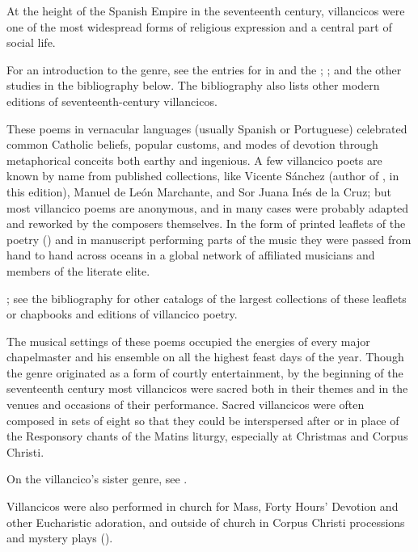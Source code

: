 
At the height of the Spanish Empire in the seventeenth century,
villancicos were one of the most widespread forms of religious expression and a 
central part of social life.%
  \begin{Footnote}
      For an introduction to the genre, see the entries for  in 
       and the ; \autocites{Laird:VC}{Knighton-Torrente:VCs};
      and the other studies in the bibliography below.
      The bibliography also lists other modern editions of seventeenth-century
      villancicos.  
  \end{Footnote}
These poems in vernacular languages (usually Spanish or Portuguese) celebrated 
common Catholic beliefs, popular customs, and modes of devotion through 
metaphorical conceits both earthy and ingenious.
A few villancico poets are known by name from published collections, like
Vicente Sánchez (author of , in this edition),
Manuel de León Marchante, and Sor Juana Inés de la Cruz; but most villancico
poems are anonymous, and in many cases were probably adapted and reworked by the
composers themselves.
In the form of printed leaflets of the poetry () and in 
manuscript performing parts of the music they were passed from hand to hand 
across oceans in a global network of affiliated musicians and members of the 
literate elite.%
  \begin{Footnote}
      \Autocite{BNE:VCs17C}; see the bibliography for other catalogs of the
      largest collections of these leaflets or chapbooks and editions of
      villancico poetry.
  \end{Footnote}

The musical settings of these poems occupied the energies of every major 
chapelmaster and his ensemble on all the highest feast days of the year.
Though the genre originated as a form of courtly entertainment, by the 
beginning of the seventeenth century most villancicos were sacred both in their 
themes and in the venues and occasions of their performance.
Sacred villancicos were often composed in sets of eight so that they could be 
interspersed after or in place of the Responsory chants of the Matins liturgy, 
especially at Christmas and Corpus Christi.%
    \begin{Footnote}
        On the villancico's sister genre, see \autocite{Goldman:Responsory}.
    \end{Footnote}
Villancicos were also performed in church for Mass, Forty Hours' Devotion and 
other Eucharistic adoration, and outside of church in Corpus Christi 
processions and mystery plays ().

